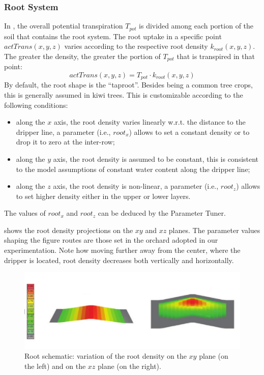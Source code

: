 \subsubsection{Root System}
\label{orchard-sec:root}
In \olab{}, the overall potential transpiration $T_{pot}$ is divided among each portion of the soil that contains the root system.
The root uptake in a specific point $actTrans(x,y,z)$ varies according to the respective root density $k_{root}(x,y,z)$.
The greater the density, the greater the portion of $T_{pot}$ that is transpired in that point:
%
\begin{equation}
\label{root1} actTrans(x,y,z) = T_{pot} \cdot k_{root}(x,y,z)
\end{equation}
%
By default, the root shape is the ``taproot''.
Besides being a common tree crops, this is generally assumed in kiwi trees. 
This is customizable according to the following conditions:
\begin{itemize}
    \item along the $x$ axis, the root density varies linearly w.r.t. the distance to the dripper line, a parameter (i.e., $root_x$) allows to set a constant density or to drop it to zero at the inter-row;
    \item along the $y$ axis, the root density is assumed to be constant, this is consistent to the model assumptions of constant water content along the dripper line; 
    \item along the $z$ axis, the root density is non-linear, a parameter (i.e., $root_z$) allows to set higher density either in the upper or lower layers.
\end{itemize}

The values of $root_x$ and $root_z$ can be deduced by the Parameter Tuner.

 shows the root density projections on the $xy$ and $xz$  planes.
The parameter values shaping the figure routes are those set in the orchard adopted in our experimentation.
Note how moving further away from the center, where the dripper is located, root density decreases both vertically and horizontally. 

\begin{figure}[t]
\includegraphics[scale=0.6]{chapters/physics-aware/orchard/img/root.pdf}
\caption{Root schematic: variation of the root density on the $xy$ plane (on the left) and on the $xz$ plane (on the right).}
\label{orchard-fig:root}
\end{figure}


